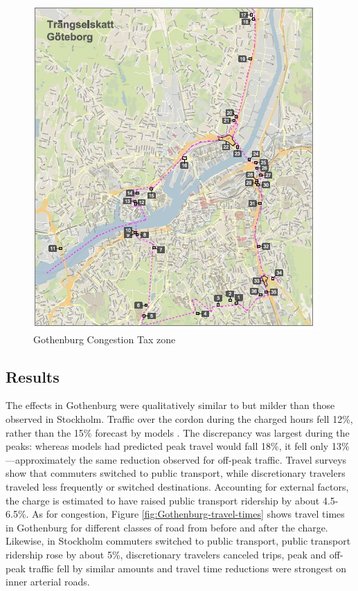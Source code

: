 \begin{figure}[ht]
\includegraphics[]{../img/gburg-congestion-tax-map.jpg}

\caption{Gothenburg Congestion Tax zone \citep{transportstyrelsen2015}\label{fig:Gothenburg-map}}
\end{figure}

\subsection{Results}

The effects in Gothenburg were qualitatively similar to but milder than those observed in Stockholm. Traffic over the cordon during the charged hours fell 12\%, rather than the 15\% forecast by models \citep{Borjesson2015}. The discrepancy was largest during the peaks: whereas models had predicted peak travel would fall 18\%, it fell only 13\%---approximately the same reduction observed for off-peak traffic. Travel surveys show that commuters switched to public transport, while discretionary travelers traveled less frequently or switched destinations. Accounting for external factors, the charge is estimated to have raised public transport ridership by about 4.5-6.5\%. As for congestion, Figure \ref{fig:Gothenburg-travel-times} shows travel times in Gothenburg for different classes of road from before and after the charge. Likewise, in Stockholm commuters switched to public transport, public transport ridership rose by about 5\%, discretionary travelers canceled trips, peak and off-peak traffic fell by similar amounts and travel time reductions were strongest on inner arterial roads.

